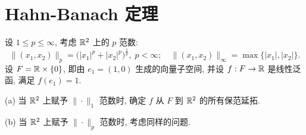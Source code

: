 \setcounter{chapter}{7}
\chapter{Hahn-Banach 定理}
\thispagestyle{empty}


\begin{exercise}
    设 $1\leq p\leq\infty$, 考虑 $\mathbb{R}^2$ 上的 $p$ 范数:
    \[\|(x_1,x_2)\|_p=\bigl(|x_1|^p+|x_2|^p\bigr)^{\frac{1}{p}},\;p<\infty;\quad \|(x_1,x_2)\|_{\infty}=\max\{|x_1|,|x_2|\}.\]
    设 $F=\mathbb{R}\times\{0\}$, 即由 $e_1=(1,0)$ 生成的向量子空间, 并设 $f:F\to\mathbb{R}$
    是线性泛函, 满足 $f(e_1)=1$.

    (a) 当 $\mathbb{R}^2$ 上赋予 $\|\cdot\|_1$ 范数时, 确定 $f$ 从 $F$ 到 $\mathbb{R}^2$ 的所有保范延拓.

    (b) 当 $\mathbb{R}^2$ 上赋予 $\|\cdot\|_p$ 范数时, 考虑同样的问题.
\end{exercise}

